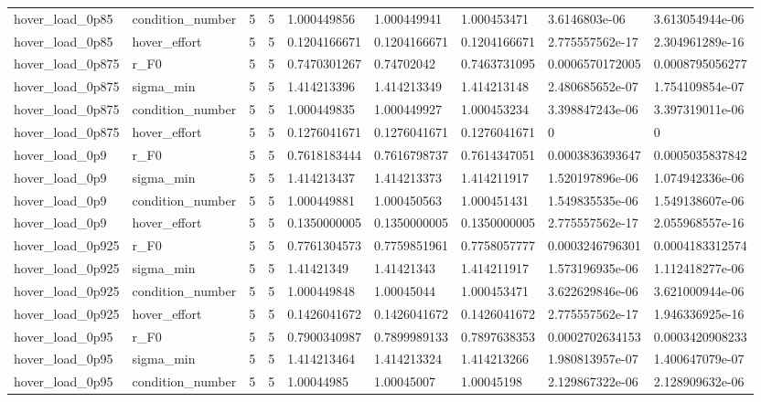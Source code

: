 \begin{tabular}{@{}lllllllll@{}}
hover\_load\_0p85 & condition\_number & 5 & 5 & 1.000449856 & 1.000449941 & 1.000453471 & 3.6146803e-06 & 3.613054944e-06 \\
hover\_load\_0p85 & hover\_effort & 5 & 5 & 0.1204166671 & 0.1204166671 & 0.1204166671 & 2.775557562e-17 & 2.304961289e-16 \\
hover\_load\_0p875 & r\_F0 & 5 & 5 & 0.7470301267 & 0.74702042 & 0.7463731095 & 0.0006570172005 & 0.0008795056277 \\
hover\_load\_0p875 & sigma\_min & 5 & 5 & 1.414213396 & 1.414213349 & 1.414213148 & 2.480685652e-07 & 1.754109854e-07 \\
hover\_load\_0p875 & condition\_number & 5 & 5 & 1.000449835 & 1.000449927 & 1.000453234 & 3.398847243e-06 & 3.397319011e-06 \\
hover\_load\_0p875 & hover\_effort & 5 & 5 & 0.1276041671 & 0.1276041671 & 0.1276041671 & 0 & 0 \\
hover\_load\_0p9 & r\_F0 & 5 & 5 & 0.7618183444 & 0.7616798737 & 0.7614347051 & 0.0003836393647 & 0.0005035837842 \\
hover\_load\_0p9 & sigma\_min & 5 & 5 & 1.414213437 & 1.414213373 & 1.414211917 & 1.520197896e-06 & 1.074942336e-06 \\
hover\_load\_0p9 & condition\_number & 5 & 5 & 1.000449881 & 1.000450563 & 1.000451431 & 1.549835535e-06 & 1.549138607e-06 \\
hover\_load\_0p9 & hover\_effort & 5 & 5 & 0.1350000005 & 0.1350000005 & 0.1350000005 & 2.775557562e-17 & 2.055968557e-16 \\
hover\_load\_0p925 & r\_F0 & 5 & 5 & 0.7761304573 & 0.7759851961 & 0.7758057777 & 0.0003246796301 & 0.0004183312574 \\
hover\_load\_0p925 & sigma\_min & 5 & 5 & 1.41421349 & 1.41421343 & 1.414211917 & 1.573196935e-06 & 1.112418277e-06 \\
hover\_load\_0p925 & condition\_number & 5 & 5 & 1.000449848 & 1.00045044 & 1.000453471 & 3.622629846e-06 & 3.621000944e-06 \\
hover\_load\_0p925 & hover\_effort & 5 & 5 & 0.1426041672 & 0.1426041672 & 0.1426041672 & 2.775557562e-17 & 1.946336925e-16 \\
hover\_load\_0p95 & r\_F0 & 5 & 5 & 0.7900340987 & 0.7899989133 & 0.7897638353 & 0.0002702634153 & 0.0003420908233 \\
hover\_load\_0p95 & sigma\_min & 5 & 5 & 1.414213464 & 1.414213324 & 1.414213266 & 1.980813957e-07 & 1.400647079e-07 \\
hover\_load\_0p95 & condition\_number & 5 & 5 & 1.00044985 & 1.00045007 & 1.00045198 & 2.129867322e-06 & 2.128909632e-06 \\

\end{tabular}
